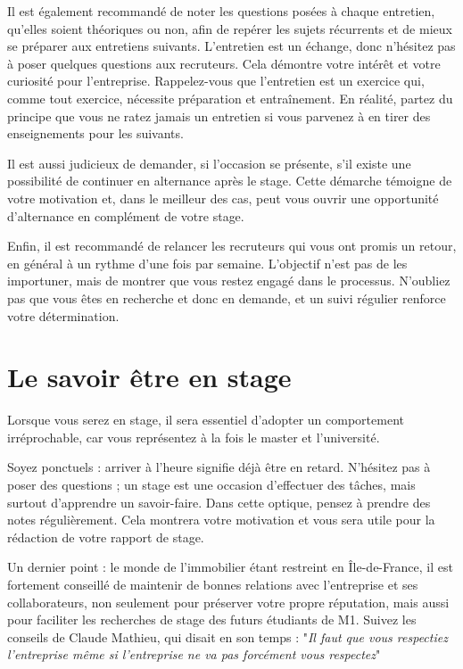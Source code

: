 \documentclass[a4paper, 12pt]{report}
\begin{document}
Il est également recommandé de noter les questions posées à chaque entretien, qu’elles soient théoriques ou non, afin de repérer les sujets récurrents et de mieux se préparer aux entretiens suivants. L’entretien est un échange, donc n’hésitez pas à poser quelques questions aux recruteurs. Cela démontre votre intérêt et votre curiosité pour l’entreprise. Rappelez-vous que l’entretien est un exercice qui, comme tout exercice, nécessite préparation et entraînement. En réalité, partez du principe que vous ne ratez jamais un entretien si vous parvenez à en tirer des enseignements pour les suivants.

Il est aussi judicieux de demander, si l’occasion se présente, s’il existe une possibilité de continuer en alternance après le stage. Cette démarche témoigne de votre motivation et, dans le meilleur des cas, peut vous ouvrir une opportunité d’alternance en complément de votre stage.

Enfin, il est recommandé de relancer les recruteurs qui vous ont promis un retour, en général à un rythme d’une fois par semaine. L’objectif n’est pas de les importuner, mais de montrer que vous restez engagé dans le processus. N’oubliez pas que vous êtes en recherche et donc en demande, et un suivi régulier renforce votre détermination.

\section{Le savoir être en stage}

Lorsque vous serez en stage, il sera essentiel d’adopter un comportement irréprochable, car vous représentez à la fois le master et l’université.

Soyez ponctuels : arriver à l’heure signifie déjà être en retard. N’hésitez pas à poser des questions ; un stage est une occasion d’effectuer des tâches, mais surtout d’apprendre un savoir-faire. Dans cette optique, pensez à prendre des notes régulièrement. Cela montrera votre motivation et vous sera utile pour la rédaction de votre rapport de stage.

Un dernier point : le monde de l’immobilier étant restreint en Île-de-France, il est fortement conseillé de maintenir de bonnes relations avec l’entreprise et ses collaborateurs, non seulement pour préserver votre propre réputation, mais aussi pour faciliter les recherches de stage des futurs étudiants de M1. Suivez les conseils de Claude Mathieu, qui disait en son temps : "\textit{Il faut que vous respectiez l'entreprise même si l'entreprise ne va pas forcément vous respectez}"
\end{document}
